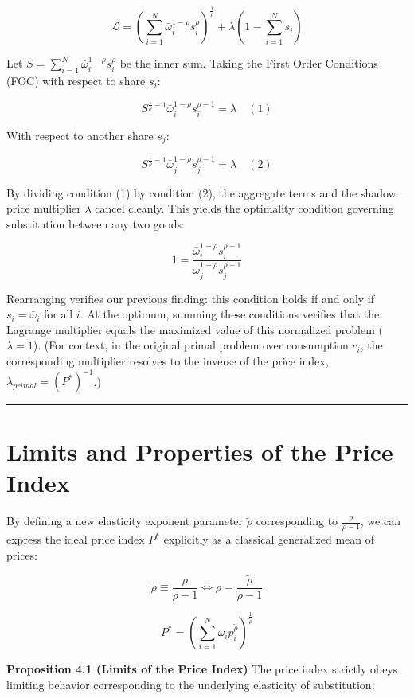 \documentclass{article}
\begin{document}
$$ \mathcal{L} = \left( \sum_{i=1}^N \bar{\omega}_i^{1-\rho} s_i^\rho \right)^{\frac{1}{\rho}} + \lambda \left( 1 - \sum_{i=1}^N s_i \right) $$

Let $S = \sum_{i=1}^N \bar{\omega}_i^{1-\rho} s_i^\rho$ be the inner sum.
Taking the First Order Conditions (FOC) with respect to share $s_i$:

$$ S^{\frac{1}{\rho}-1} \bar{\omega}_i^{1-\rho} s_i^{\rho-1} = \lambda \quad (1) $$

With respect to another share $s_j$:

$$ S^{\frac{1}{\rho}-1} \bar{\omega}_j^{1-\rho} s_j^{\rho-1} = \lambda \quad (2) $$

By dividing condition (1) by condition (2), the aggregate terms and the
shadow price multiplier $\lambda$ cancel cleanly. This yields the
optimality condition governing substitution between any two goods:

$$ 1 = \frac{\bar{\omega}_i^{1-\rho} s_i^{\rho-1}}{\bar{\omega}_j^{1-\rho} s_j^{\rho-1}} $$

Rearranging verifies our previous finding: this condition
holds if and only if $s_i = \bar{\omega}_i$ for all $i$. At the optimum,
summing these conditions verifies that the Lagrange multiplier equals
the maximized value of this normalized problem ($\lambda = 1$). (For
context, in the original primal problem over consumption $c_i$, the
corresponding multiplier resolves to the inverse of the price index,
$\lambda_{primal} = (P^*)^{-1}$.)

\vspace{1em}\hrule\vspace{1em}

\section{Limits and Properties of the Price Index}

By defining a new elasticity exponent parameter $\tilde{\rho}$
corresponding to $\frac{\rho}{\rho-1}$, we can express the ideal price
index $P^*$ explicitly as a classical generalized mean of prices:

$$ \tilde{\rho} \equiv \frac{\rho}{\rho-1} \iff \rho = \frac{\tilde{\rho}}{\tilde{\rho}-1} $$

$$ P^* = \left( \sum_{i=1}^N \omega_i p_i^{\tilde{\rho}} \right)^{\frac{1}{\tilde{\rho}}} $$

\textbf{Proposition 4.1 (Limits of the Price Index)} The price index strictly
obeys limiting behavior corresponding to the underlying elasticity of
substitution:
\end{document}
